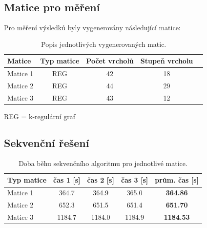 \documentclass[12pt]{article}
\begin{document}
\subsection{Matice pro měření}
Pro měření výsledků byly vygenerovány následující matice:
\begin{table}[ht]
\centering
\begin{tabular}{|l|c|c|c|c|}
\hline \textbf{Matice} & \textbf{Typ matice} & \textbf{Počet vrcholů} & \textbf{Stupeň vrcholu} \\
\hline 
\hline Matice 1 & REG & 42 & 18 \\ 
\hline Matice 2 & REG & 44 & 29 \\ 
\hline Matice 3 & REG & 43 & 12 \\ 
\hline 
\end{tabular}
\caption{Popis jednotlivých vygenerovaných matic.}
\label{matice_popis}	
\end{table}

REG = k-regulární graf

\subsection{Sekvenční řešení}

\begin{table}[ht]
\centering
\begin{tabular}{|l|c|c|c|c|}
\hline \textbf{Typ matice} & \textbf{čas 1 [s]} & \textbf{čas 2 [s]} & \textbf{čas 3 [s]} & \textbf{prům. čas [s]} \\
\hline 
\hline Matice 1 & 364.7 & 364.9 & 365.0 & \textbf{364.86} \\ 
\hline Matice 2 & 652.3 & 651.5 & 651.4 & \textbf{651.70} \\ 
\hline Matice 3 & 1184.7 & 1184.0 & 1184.9 & \textbf{1184.53} \\ 
\hline 
\end{tabular}
\caption{Doba běhu sekvenčního algoritmu pro jednotlivé matice.}
\label{doba_behu_sekvencne}	
\end{table}

\end{document}
